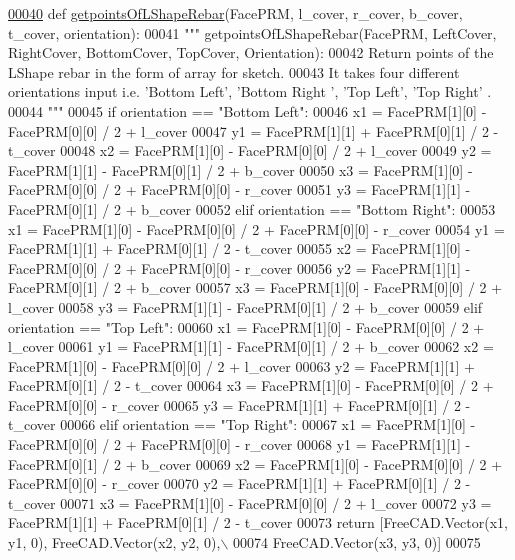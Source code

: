 \begin{DoxyCode}
\hypertarget{namespaceLShapeRebar.tex_l00040}{}\hyperlink{namespaceLShapeRebar_a3019960c6f6476cb70df9ee06f330dfb}{00040} \textcolor{keyword}{def }\hyperlink{namespaceLShapeRebar_a3019960c6f6476cb70df9ee06f330dfb}{getpointsOfLShapeRebar}(FacePRM, l\_cover, r\_cover, b\_cover, t\_cover, orientation):
00041     \textcolor{stringliteral}{""" getpointsOfLShapeRebar(FacePRM, LeftCover, RightCover, BottomCover, TopCover, Orientation):}
00042 \textcolor{stringliteral}{    Return points of the LShape rebar in the form of array for sketch.}
00043 \textcolor{stringliteral}{    It takes four different orientations input i.e. 'Bottom Left', 'Bottom Right ', 'Top Left', 'Top Right'
      .}
00044 \textcolor{stringliteral}{    """}
00045     \textcolor{keywordflow}{if} orientation == \textcolor{stringliteral}{"Bottom Left"}:
00046         x1 = FacePRM[1][0] - FacePRM[0][0] / 2 + l\_cover
00047         y1 = FacePRM[1][1] + FacePRM[0][1] / 2 - t\_cover
00048         x2 = FacePRM[1][0] - FacePRM[0][0] / 2 + l\_cover
00049         y2 = FacePRM[1][1] - FacePRM[0][1] / 2 + b\_cover
00050         x3 = FacePRM[1][0] - FacePRM[0][0] / 2 + FacePRM[0][0] - r\_cover
00051         y3 = FacePRM[1][1] - FacePRM[0][1] / 2 + b\_cover
00052     \textcolor{keywordflow}{elif} orientation == \textcolor{stringliteral}{"Bottom Right"}:
00053         x1 = FacePRM[1][0] - FacePRM[0][0] / 2 + FacePRM[0][0] - r\_cover
00054         y1 = FacePRM[1][1] + FacePRM[0][1] / 2 - t\_cover
00055         x2 = FacePRM[1][0] - FacePRM[0][0] / 2 + FacePRM[0][0] - r\_cover
00056         y2 = FacePRM[1][1] - FacePRM[0][1] / 2 + b\_cover
00057         x3 = FacePRM[1][0] - FacePRM[0][0] / 2 + l\_cover
00058         y3 = FacePRM[1][1] - FacePRM[0][1] / 2 + b\_cover
00059     \textcolor{keywordflow}{elif} orientation == \textcolor{stringliteral}{"Top Left"}:
00060         x1 = FacePRM[1][0] - FacePRM[0][0] / 2 + l\_cover
00061         y1 = FacePRM[1][1] - FacePRM[0][1] / 2 + b\_cover
00062         x2 = FacePRM[1][0] - FacePRM[0][0] / 2 + l\_cover
00063         y2 = FacePRM[1][1] + FacePRM[0][1] / 2 - t\_cover
00064         x3 = FacePRM[1][0] - FacePRM[0][0] / 2 + FacePRM[0][0] - r\_cover
00065         y3 = FacePRM[1][1] + FacePRM[0][1] / 2 - t\_cover
00066     \textcolor{keywordflow}{elif} orientation == \textcolor{stringliteral}{"Top Right"}:
00067         x1 = FacePRM[1][0] - FacePRM[0][0] / 2 + FacePRM[0][0] - r\_cover
00068         y1 = FacePRM[1][1] - FacePRM[0][1] / 2 + b\_cover
00069         x2 = FacePRM[1][0] - FacePRM[0][0] / 2 + FacePRM[0][0] - r\_cover
00070         y2 = FacePRM[1][1] + FacePRM[0][1] / 2 - t\_cover
00071         x3 = FacePRM[1][0] - FacePRM[0][0] / 2 + l\_cover
00072         y3 = FacePRM[1][1] + FacePRM[0][1] / 2 - t\_cover
00073     \textcolor{keywordflow}{return} [FreeCAD.Vector(x1, y1, 0), FreeCAD.Vector(x2, y2, 0),\(\backslash\)
00074            FreeCAD.Vector(x3, y3, 0)]
00075 
\end{DoxyCode}


